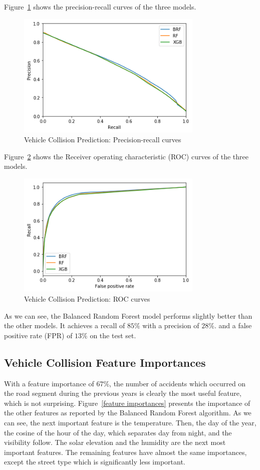 \documentclass[conference]{IEEEtran}
\begin{document}
Figure~\ref{fig:precision-recall} shows the precision-recall curves of the three models.

\begin{figure}[htbp]
\centerline{\includegraphics[height=6cm, keepaspectratio]{figures/pr.png}}
\caption{Vehicle Collision Prediction: Precision-recall curves}
\label{fig:precision-recall}
\end{figure}

Figure~\ref{fig:roc} shows the Receiver operating characteristic (ROC) curves of the three models.

\begin{figure}[htbp]
\centerline{\includegraphics[height=6cm, keepaspectratio]{figures/roc.png}}
\caption{Vehicle Collision Prediction: ROC curves}
\label{fig:roc}
\end{figure}

As we can see, the Balanced Random Forest model performs slightly better than the other models.
It achieves a recall of $85\%$ with a precision of $28\%$. and a false positive rate (FPR) of $13\%$ on the test set.

\subsection{Vehicle Collision Feature Importances}
With a
feature importance of $67\%$, the number of accidents which occurred on the
road segment during the previous years is clearly the most useful feature, which
is not surprising. Figure~\ref{feature importances} presents the
importance of the other features as reported by the Balanced Random Forest
algorithm. As we can see, the next important feature is the temperature. 
Then, the day of the year, the cosine of the hour of the day, which separates day from night,
and the visibility follow. The solar elevation and the humidity are the next most important features. The remaining features have almost the same importances, except the street type which
is significantly less important.
\end{document}

